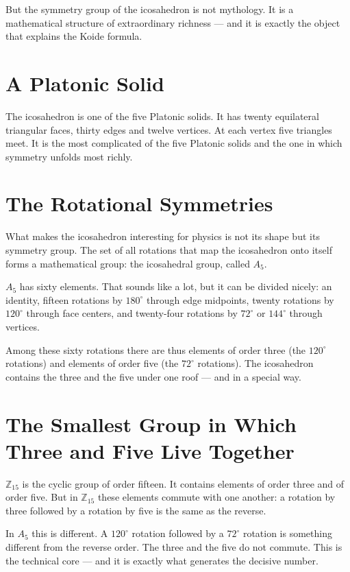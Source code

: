 \documentclass[12pt,oneside]{book}
\begin{document}
But the symmetry group of the icosa\-hedron is not mythology. It is a mathematical structure of extraordinary richness --- and it is exactly the object that explains the Koide formula.

\section{A Platonic Solid}

The icosa\-hedron is one of the five Platonic solids. It has twenty equilateral triangular faces, thirty edges and twelve vertices. At each vertex five triangles meet. It is the most complicated of the five Platonic solids and the one in which symmetry unfolds most richly.

\section{The Rotational Symmetries}

What makes the icosa\-hedron interesting for physics is not its shape but its symmetry group. The set of all rotations that map the icosa\-hedron onto itself forms a mathematical group: the icosahedral group, called $A_5$.

$A_5$ has sixty elements. That sounds like a lot, but it can be divided nicely: an identity, fifteen rotations by $180^\circ$ through edge midpoints, twenty rotations by $120^\circ$ through face centers, and twenty-four rotations by $72^\circ$ or $144^\circ$ through vertices.

Among these sixty rotations there are thus elements of order three (the $120^\circ$ rotations) and elements of order five (the $72^\circ$ rotations). The icosa\-hedron contains the three and the five under one roof --- and in a special way.

\section{The Smallest Group in Which Three and Five Live Together}

$\mathbb{Z}_{15}$ is the cyclic group of order fifteen. It contains elements of order three and of order five. But in $\mathbb{Z}_{15}$ these elements commute with one another: a rotation by three followed by a rotation by five is the same as the reverse.

In $A_5$ this is different. A $120^\circ$ rotation followed by a $72^\circ$ rotation is something different from the reverse order. The three and the five do not commute. This is the technical core --- and it is exactly what generates the decisive number.
\end{document}
